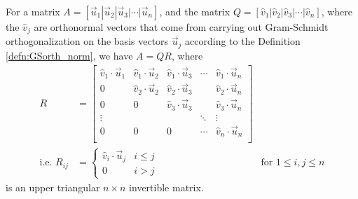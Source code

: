 \begin{proper}
\label{proper:QRdecompose}
For a matrix $A = [\vec{u}_1|\vec{u}_2|\vec{u}_3|\cdots|\vec{u}_n]$, and the matrix $Q = [\hat{v}_1|\hat{v}_2|\hat{v}_3|\cdots|\hat{v}_n]$, where the $\hat{v}_j$ are orthonormal vectors that come from carrying out Gram-Schmidt orthogonalization on the basis vectors $\vec{u}_j$ according to the Definition \ref{defn:GSorth_norm}, we have $A = QR$, where
\begin{align*}
R &= 
\begin{bmatrix}
\hat{v}_1 \cdot \vec{u}_1 &  \hat{v}_1 \cdot \vec{u}_2 & \hat{v}_1 \cdot \vec{u}_3 & \cdots & \hat{v}_1 \cdot \vec{u}_n \\
0 & \hat{v}_2 \cdot \vec{u}_2 &  \hat{v}_2 \cdot \vec{u}_3 &  & \hat{v}_2 \cdot \vec{u}_n \\
0 & 0 & \hat{v}_3 \cdot \vec{u}_3 &  & \hat{v}_3 \cdot \vec{u}_n \\
\vdots & & & \ddots & \vdots\\
0 & 0 & 0 & \cdots & \hat{v}_n\cdot \vec{u}_n \\
\end{bmatrix} \\
\text{i.e. } R_{ij} &= 
\begin{cases}
\hat{v}_i \cdot \vec{u}_j & i \leq j \\
0 & i > j
\end{cases}
& \text{for $1 \leq i, j \leq n$}
\end{align*}
is an upper triangular $n \times n$ invertible matrix.
\end{proper}
